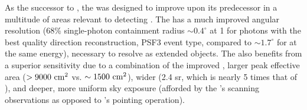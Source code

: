 As the successor to \egret{}, the \lat{} was designed to improve upon its predecessor in a multitude of areas relevant to detecting \snrs{} \citep{atwood09,lat_perf}. The \lat{} has a much improved angular resolution (68\% single-photon containment radius $\sim 0.4^{\circ}$ at 1\gev{} for photons with the best quality direction reconstruction, PSF3 event type, compared to $\sim 1.7^{\circ}$ for \egret{} at the same energy), necessary to resolve \snrs{} as extended objects. The \lat{} also benefits from a superior sensitivity due to a combination of the improved \psf, larger peak effective area ($ {\rm > 9000~cm^2}$ vs. ${\rm \sim 1500~cm^2}$), wider \fov{} (2.4 sr, which is nearly 5 times that of \egret{}), and deeper, more uniform sky exposure (afforded by the \lat's scanning observations as opposed to \egret's pointing operation). 

